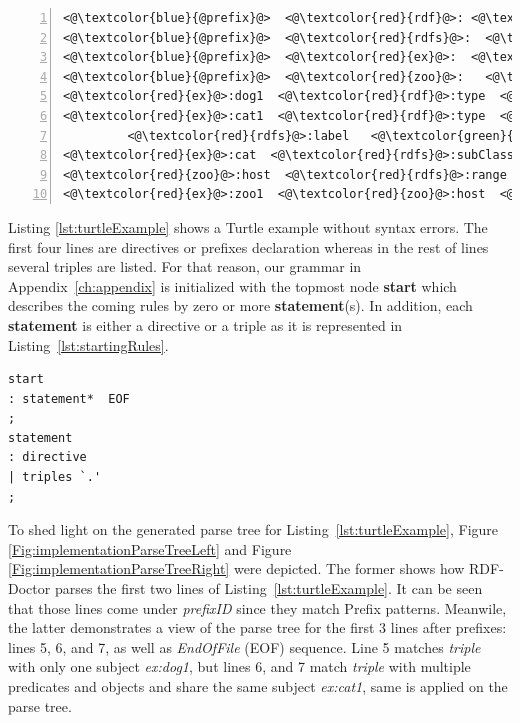 \begin{lstlisting}[label=lst:turtleExample, numbers=left, caption={RDF example in Turtle serialization format}]
<@\textcolor{blue}{@prefix}@>  <@\textcolor{red}{rdf}@>: <@\textcolor{orange}{<http://www.w3.org/1999/02/22-rdf-syntax-ns\#>}@> .
<@\textcolor{blue}{@prefix}@>  <@\textcolor{red}{rdfs}@>:  <@\textcolor{orange}{<http://www.w3.org/2000/01/rdf-schema\#>}@> .
<@\textcolor{blue}{@prefix}@>  <@\textcolor{red}{ex}@>:  <@\textcolor{orange}{<http://example.org/>}@> .
<@\textcolor{blue}{@prefix}@>  <@\textcolor{red}{zoo}@>:   <@\textcolor{orange}{<http://example.org/zoo/> }@> .
<@\textcolor{red}{ex}@>:dog1  <@\textcolor{red}{rdf}@>:type  <@\textcolor{red}{ex}@>:animal .
<@\textcolor{red}{ex}@>:cat1  <@\textcolor{red}{rdf}@>:type  <@\textcolor{red}{ex}@>:cat ;
         <@\textcolor{red}{rdfs}@>:label   <@\textcolor{green}{``Lusi"@en}@> .
<@\textcolor{red}{ex}@>:cat  <@\textcolor{red}{rdfs}@>:subClassOf  <@\textcolor{red}{ex}@>:animal .
<@\textcolor{red}{zoo}@>:host  <@\textcolor{red}{rdfs}@>:range  <@\textcolor{red}{ex}@>:animal .
<@\textcolor{red}{ex}@>:zoo1  <@\textcolor{red}{zoo}@>:host  <@\textcolor{red}{ex}@>:cat2 .
\end{lstlisting}

Listing \ref{lst:turtleExample} shows a Turtle example without syntax errors. 
The first four lines are directives or prefixes declaration whereas in the rest of lines several triples are listed.  
For that reason, our grammar in Appendix~\ref{ch:appendix} is initialized with the topmost node \textbf{start} which describes the coming rules by zero or more  \textbf{statement}(s). 
In addition, each \textbf{statement} is either a directive or a triple as it is represented in Listing~\ref{lst:startingRules}.

\begin{lstlisting}[label=lst:startingRules,
caption={Starting rules in the grammar file}] 
start
: statement*  EOF
;
statement
: directive
| triples `.'
;
\end{lstlisting}

To shed light on the generated parse tree for Listing~\ref{lst:turtleExample}, Figure \ref{Fig:implementationParseTreeLeft}
and Figure \ref{Fig:implementationParseTreeRight}
were depicted. The former shows how RDF-Doctor parses the first two lines of  Listing~\ref{lst:turtleExample}. It can be seen that those lines come under \emph{prefixID} since they match Prefix patterns. Meanwile, the latter demonstrates a view of the parse tree for the first 3 lines after prefixes: lines 5, 6, and 7, as well as \emph{EndOfFile} (EOF) sequence. Line 5 matches \emph{triple} with only one subject \emph{ex:dog1}, but lines 6, and 7 match \emph{triple} with multiple predicates and objects and share the same subject \emph{ex:cat1}, same is applied on the parse tree.  





